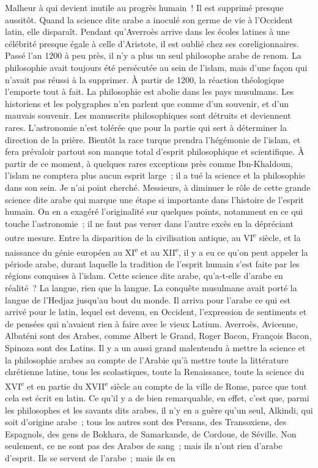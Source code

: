 \documentclass[french,twoside]{book} %
\newcommand\orgName[1]{#1}
\newcommand\persName[1]{#1}
\newcommand\placeName[1]{#1}
\begin{document}
Malheur à qui devient inutile au progrès humain ! Il est supprimé presque aussitôt. Quand la science dite arabe a inoculé son germe de vie à l’{\orgName Occident latin}, elle disparaît. Pendant qu’{\persName Averroès} arrive dans les écoles latines à une célébrité presque égale à celle d’{\persName Aristote}, il est oublié chez ses coreligionnaires. Passé l’an 1200 à peu près, il n’y a plus un seul philosophe arabe de renom. La philosophie avait toujours été persécutée au sein de l’islam, mais d’une façon qui n’avait pas réussi à la supprimer. À partir de 1200, la réaction théologique l’emporte tout à fait. La philosophie est abolie dans les pays musulmans. Les historiens et les polygraphes n’en parlent que comme d’un souvenir, et d’un mauvais souvenir. Les manuscrits philosophiques sont détruits et deviennent rares. L’astronomie n’est tolérée que pour la partie qui sert à déterminer la direction de la prière. Bientôt la race turque prendra l’hégémonie de l’islam, et fera prévaloir partout son manque total d’esprit philosophique et scientifique. À partir de ce moment, à quelques rares exceptions près comme {\persName Ibn-Khaldoun}, l’islam ne comptera plus aucun esprit large ; il a tué la science et la philosophie dans son sein. Je n’ai point cherché. Messieurs, à diminuer le rôle de cette grande science dite arabe qui marque une étape si importante dans l’histoire de l’esprit humain. On en a exagéré l’originalité sur quelques points, notamment en ce qui touche l’astronomie ; il ne faut pas verser dans l’autre excès en la dépréciant outre mesure. Entre la disparition de la civilisation antique, au VI\textsuperscript{e} siècle, et la naissance du génie européen au XI\textsuperscript{e} et au XII\textsuperscript{e}, il y a eu ce qu’on peut appeler la période arabe, durant laquelle la tradition de l’esprit humain s’est faite par les régions conquises à l’islam. Cette science dite arabe, qu’a-t-elle d’arabe en réalité ? La langue, rien que la langue. La conquête musulmane avait porté la langue de l’Hedjaz jusqu’au bout du monde. Il arriva pour l’arabe ce qui est arrivé pour le latin, lequel est devenu, en {\placeName Occident}, l’expression de sentiments et de pensées qui n’avaient rien à faire avec le vieux Latium. {\persName Averroès}, {\persName Avicenne}, {\persName Albaténi} sont des Arabes, comme {\persName Albert le Grand}, {\persName Roger Bacon}, {\persName François Bacon}, {\persName Spinoza} sont des Latins. Il y a un aussi grand malentendu à mettre la science et la philosophie arabes au compte de l’{\placeName Arabie} qu’à mettre toute la littérature chrétienne latine, tous les scolastiques, toute la Renaissance, toute la science du XVI\textsuperscript{e} et en partie du XVII\textsuperscript{e} siècle au compte de la ville de {\placeName Rome}, parce que tout cela est écrit en latin. Ce qu’il y a de bien remarquable, en effet, c’est que, parmi les philosophes et les savants dits arabes, il n’y en a guère qu’un seul, {\persName Alkindi}, qui soit d’origine arabe ; tous les autres sont des Persans, des Transoxiens, des Espagnols, des gens de {\placeName Bokhara}, de {\placeName Samarkande}, de {\placeName Cordoue}, de {\placeName Séville}. Non seulement, ce ne sont pas des Arabes de sang ; mais ils n’ont rien d’arabe d’esprit. Ils se servent de l’arabe ; mais ils en 
\end{document}
